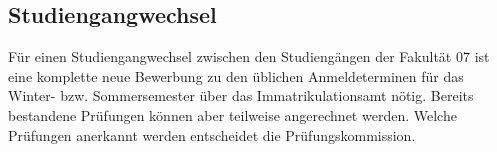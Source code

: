 \subsection{Studiengangwechsel}
Für einen Studiengangwechsel zwischen den Studiengängen der 
Fakultät 07 ist eine komplette neue Bewerbung zu den üblichen 
Anmeldeterminen für das Winter- bzw. Sommersemester über das 
Immatrikulationsamt nötig. Bereits bestandene Prüfungen können aber 
teilweise angerechnet werden. Welche Prüfungen anerkannt werden 
entscheidet die Prüfungskommission. 